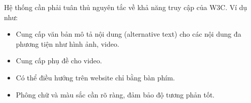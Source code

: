 \documentclass[./../main_file.tex]{subfiles}
\begin{document}
	Hệ thống cần phải tuân thủ nguyên tắc về khả năng truy cập của W3C. Ví dụ như:
	
	\begin{itemize}
		\item Cung cấp văn bản mô tả nội dung (alternative text) cho các nội dung đa phương tiện như hình ảnh, video.
		\item Cung cấp phụ đề cho video.
		\item Có thể điều hướng trên website chỉ bằng bàn phím.
		\item Phông chữ và màu sắc cần rõ ràng, đảm bảo độ tương phản tốt.
	\end{itemize}
\end{document}

